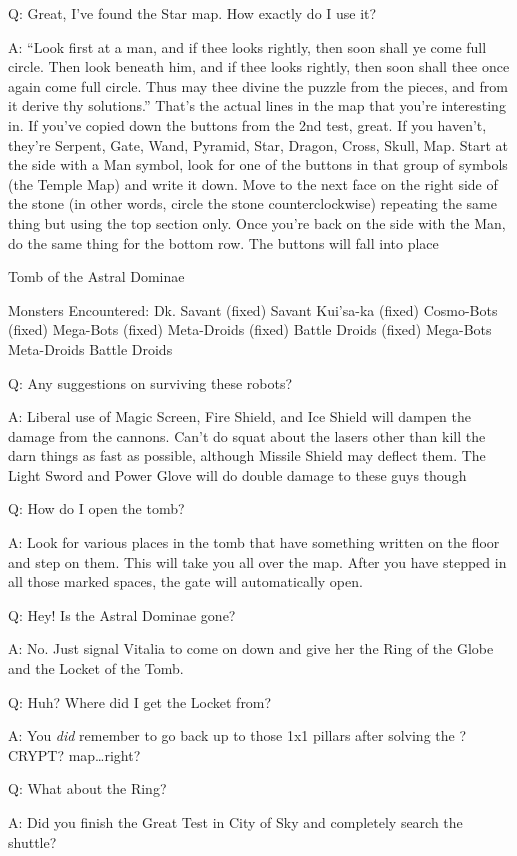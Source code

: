 \documentclass[12pt]{article}
\begin{document}
Q: Great, I've found the Star map. How exactly do I use it?

A: ``Look first at a man, and if thee looks rightly, then soon shall ye
come full circle. Then look beneath him, and if thee looks rightly, then
soon shall thee once again come full circle. Thus may thee divine the
puzzle from the pieces, and from it derive thy solutions.'' That's the
actual lines in the map that you're interesting in. If you've copied
down the buttons from the 2nd test, great. If you haven't, they're
Serpent, Gate, Wand, Pyramid, Star, Dragon, Cross, Skull, Map. Start at
the side with a Man symbol, look for one of the buttons in that group of
symbols (the Temple Map) and write it down. Move to the next face on the
right side of the stone (in other words, circle the stone
counterclockwise) repeating the same thing but using the top section
only. Once you're back on the side with the Man, do the same thing for
the bottom row. The buttons will fall into place

Tomb of the Astral Dominae

Monsters Encountered: Dk. Savant (fixed) Savant Kui'sa-ka (fixed)
Cosmo-Bots (fixed) Mega-Bots (fixed) Meta-Droids (fixed) Battle Droids
(fixed) Mega-Bots Meta-Droids Battle Droids

Q: Any suggestions on surviving these robots?

A: Liberal use of Magic Screen, Fire Shield, and Ice Shield will dampen
the damage from the cannons. Can't do squat about the lasers other than
kill the darn things as fast as possible, although Missile Shield may
deflect them. The Light Sword and Power Glove will do double damage to
these guys though

Q: How do I open the tomb?

A: Look for various places in the tomb that have something written on
the floor and step on them. This will take you all over the map. After
you have stepped in all those marked spaces, the gate will automatically
open.

Q: Hey! Is the Astral Dominae gone?

A: No. Just signal Vitalia to come on down and give her the Ring of the
Globe and the Locket of the Tomb.

Q: Huh? Where did I get the Locket from?

A: You \emph{did} remember to go back up to those 1x1 pillars after
solving the ?CRYPT? map\ldots{}right?

Q: What about the Ring?

A: Did you finish the Great Test in City of Sky and completely search
the shuttle?
\end{document}
